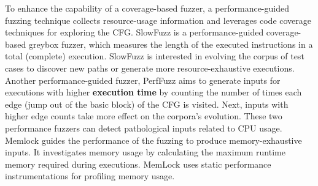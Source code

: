 To enhance the capability of a coverage-based fuzzer, a performance-guided fuzzing technique collects resource-usage information and leverages code coverage techniques for exploring the CFG. SlowFuzz \cite{petsios2017slowfuzz} is a performance-guided coverage-based greybox fuzzer, which measures the length of the executed instructions in a total (complete) execution. SlowFuzz is interested in evolving the corpus of test cases to discover new paths or generate more resource-exhaustive executions. Another performance-guided fuzzer, PerfFuzz \cite{lemieux2018perffuzz} aims to generate inputs for executions with higher \textbf{execution time} by counting the number of times each edge (jump out of the basic block) of the CFG is visited. Next, inputs with higher edge counts take more effect on the corpora's evolution. These two performance fuzzers can detect pathological inputs related to CPU usage. Memlock \cite{wen2020memlock} guides the performance of the fuzzing to produce memory-exhaustive inputs. It investigates memory usage by calculating the maximum runtime memory required during executions. MemLock uses static performance instrumentations for profiling memory usage.

